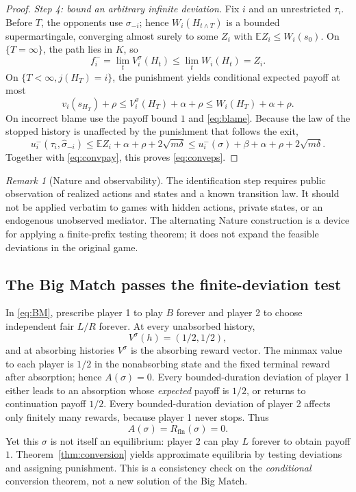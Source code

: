 \documentclass[11pt,a4paper]{article}
\numberwithin{equation}{section}
\theoremstyle{definition}
\theoremstyle{remark}
\newtheorem{remark}[theorem]{Remark}
\newcommand{\E}{\mathbb E}
\newcommand{\sig}{\sigma}
\begin{document}
\begin{proof}
\emph{Step 4: bound an arbitrary infinite deviation.}
Fix $i$ and an unrestricted $\tau_i$. Before $T$, the opponents use
$\sig_{-i}$; hence $W_i(H_{t\wedge T})$ is a bounded supermartingale,
converging almost surely to some $Z_i$ with
$\E Z_i\le W_i(s_0)$. On $\{T=\infty\}$, the path lies in $K$, so
\begin{equation}\label{eq:onK}
 f_i^-=\lim_tV_i^\sig(H_t)
 \le\lim_tW_i(H_t)=Z_i.
\end{equation}
On $\{T<\infty,j(H_T)=i\}$, the punishment yields conditional expected
payoff at most
\begin{equation}\label{eq:correctblame}
 v_i(s_{H_T})+\rho
 \le V_i^\sig(H_T)+\alpha+\rho
 \le W_i(H_T)+\alpha+\rho.
\end{equation}
On incorrect blame use the payoff bound $1$ and \eqref{eq:blame}.
Because the law of the stopped history is unaffected by the punishment
that follows the exit,
\[
 u_i^-(\tau_i,\widehat\sig_{-i})
 \le\E Z_i+\alpha+\rho+2\sqrt{m\delta}
 \le u_i^-(\sig)+\beta+\alpha+\rho+2\sqrt{m\delta}.
\]
Together with \eqref{eq:convpay}, this proves \eqref{eq:conveps}.
\end{proof}

\begin{remark}[Nature and observability]
The identification step requires public observation of realized actions
and states and a known transition law. It should not be applied verbatim
to games with hidden actions, private states, or an endogenous unobserved
mediator. The alternating Nature construction is a device for applying a
finite-prefix testing theorem; it does not expand the feasible deviations
in the original game.
\end{remark}

\subsection{The Big Match passes the finite-deviation test}
In \eqref{eq:BM}, prescribe player 1 to play $B$ forever and player 2
to choose independent fair $L/R$ forever. At every unabsorbed history,
\[
 V^\sig(h)=(1/2,1/2),
\]
and at absorbing histories $V^\sig$ is the absorbing reward vector.
The minmax value to each player is $1/2$ in the nonabsorbing state and
the fixed terminal reward after absorption; hence $A(\sig)=0$.
Every bounded-duration deviation of player 1 either leads to an absorption
whose \emph{expected} payoff is $1/2$, or returns to continuation payoff
$1/2$. Every bounded-duration deviation of player 2 affects only finitely
many rewards, because player 1 never stops. Thus
\begin{equation}\label{eq:BMcriteria}
 A(\sig)=R_{\mathrm{fin}}(\sig)=0.
\end{equation}
Yet this $\sig$ is not itself an equilibrium: player 2 can play $L$
forever to obtain payoff $1$. Theorem~\ref{thm:conversion} yields
approximate equilibria by testing deviations and assigning punishment.
This is a consistency check on the \emph{conditional} conversion theorem,
not a new solution of the Big Match.
\end{document}
